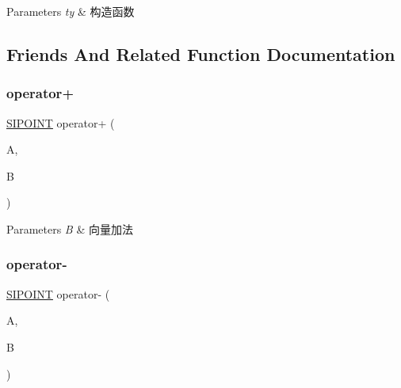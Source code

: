 \begin{DoxyParams}{Parameters}
{\em ty} & 构造函数 \\
\hline
\end{DoxyParams}


\subsection{Friends And Related Function Documentation}
\mbox{\label{struct_s_i_p_o_i_n_t_abd9be7eb5a981ba5d72d548a32052a01}} 
\subsubsection{\texorpdfstring{operator+}{operator+}}
{\footnotesize\ttfamily \hyperlink{struct_s_i_p_o_i_n_t}{S\+I\+P\+O\+I\+NT} operator+ (\begin{DoxyParamCaption}\item[{const \hyperlink{struct_s_i_p_o_i_n_t}{S\+I\+P\+O\+I\+NT} \&}]{A,  }\item[{const \hyperlink{struct_s_i_p_o_i_n_t}{S\+I\+P\+O\+I\+NT} \&}]{B }\end{DoxyParamCaption})\hspace{0.3cm}{\ttfamily [friend]}}


\begin{DoxyParams}{Parameters}
{\em B} & 向量加法 \\
\hline
\end{DoxyParams}
\mbox{\label{struct_s_i_p_o_i_n_t_a1138454683665c35746e210cbf614306}} 
\subsubsection{\texorpdfstring{operator-\/}{operator-}}
{\footnotesize\ttfamily \hyperlink{struct_s_i_p_o_i_n_t}{S\+I\+P\+O\+I\+NT} operator-\/ (\begin{DoxyParamCaption}\item[{const \hyperlink{struct_s_i_p_o_i_n_t}{S\+I\+P\+O\+I\+NT} \&}]{A,  }\item[{const \hyperlink{struct_s_i_p_o_i_n_t}{S\+I\+P\+O\+I\+NT} \&}]{B }\end{DoxyParamCaption})\hspace{0.3cm}{\ttfamily [friend]}}


